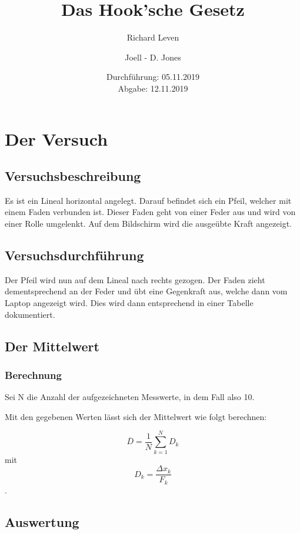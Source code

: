 \documentclass[captions=tableheading]{scrartcl}
\title{Das Hook'sche Gesetz}
\author{Richard Leven \and Joell - D. Jones}
\date{
    Durchführung: 05.11.2019\\
    Abgabe: 12.11.2019
}
\begin{document}
\maketitle
\newpage
\section{Der Versuch}
\subsection{Versuchsbeschreibung}

Es ist ein Lineal horizontal angelegt. Darauf befindet sich ein Pfeil, welcher mit einem Faden verbunden ist. Dieser Faden geht von einer Feder aus und wird von einer Rolle umgelenkt. Auf dem Bildschirm wird die ausgeübte Kraft angezeigt.

\subsection{Versuchsdurchführung}

Der Pfeil wird nun auf dem Lineal nach rechts gezogen. Der Faden zieht dementsprechend an der Feder und übt eine Gegenkraft aus, welche dann vom Laptop angezeigt wird. Dies wird dann entsprechend in einer Tabelle dokumentiert.

\newpage

\subsection{Der Mittelwert}

\subsubsection{Berechnung}

Sei N die Anzahl der aufgezeichneten Messwerte, in dem Fall also 10.

Mit den gegebenen Werten lässt sich der Mittelwert wie folgt berechnen:

\begin{equation}
\overline{D} = \frac{1}{N}\sum_{k=1}^N D_{k}
\end{equation}
mit 
\begin{equation}
D_{k} = \frac{\Delta x_{k}}{F_{k}}
\end{equation}
.
\newpage
\subsection{Auswertung}
\end{document}
